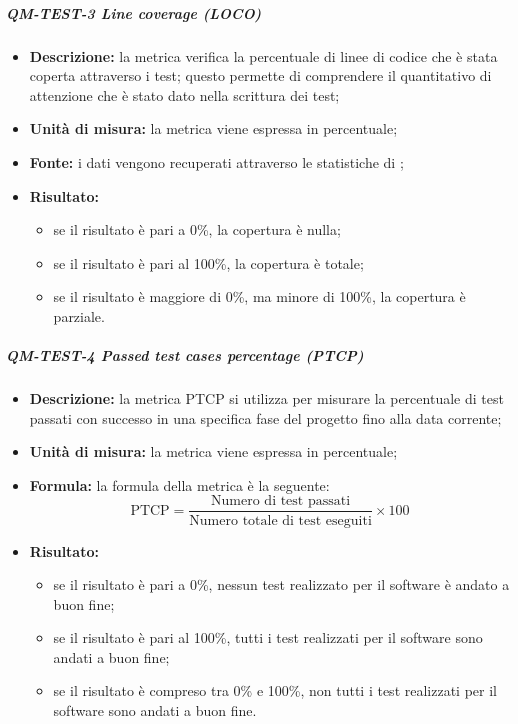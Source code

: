             \subparagraph{QM-TEST-3 Line coverage (LOCO)}
            \begin{itemize}
                \item \textbf{Descrizione: }
                    la metrica verifica la percentuale di linee di codice che è stata coperta attraverso i test; questo permette di comprendere il quantitativo di attenzione che è stato dato nella scrittura dei test;

                \item \textbf{Unità di misura: }
                	la metrica viene espressa in percentuale;

                \item \textbf{Fonte: }
                    i dati vengono recuperati attraverso le statistiche di ;

                \item \textbf{Risultato: }
                \begin{itemize}
                    \item se il risultato è pari a 0\%, la copertura è nulla;
                    \item se il risultato è pari al 100\%, la copertura è totale;
                    \item se il risultato è maggiore di 0\%, ma minore di 100\%, la copertura è parziale.
                \end{itemize}
            \end{itemize}

            \subparagraph{QM-TEST-4 Passed test cases percentage (PTCP)}
            \begin{itemize}
                \item \textbf{Descrizione: }
                la metrica PTCP si utilizza per misurare la percentuale di test passati con successo in una specifica fase del progetto fino alla data corrente;

                \item \textbf{Unità di misura: }
                la metrica viene espressa in percentuale;

                \item \textbf{Formula: }
                la formula della metrica è la seguente:
                \[
                    \text{PTCP} = \frac{\text{Numero di test passati}}{\text{Numero totale di test eseguiti}} \times 100
                \]

                \item \textbf{Risultato: }
                \begin{itemize}
                    \item se il risultato è pari a 0\%, nessun test realizzato per il software è andato a buon fine;
                    \item se il risultato è pari al 100\%, tutti i test realizzati per il software sono andati a buon fine;
                    \item se il risultato è compreso tra 0\% e 100\%, non tutti i test realizzati per il software sono andati a buon fine.
                \end{itemize}
            \end{itemize}

